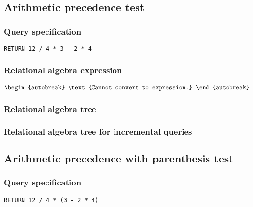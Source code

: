\subsection{Arithmetic precedence test}

\subsubsection*{Query specification}

\begin{lstlisting}
RETURN 12 / 4 * 3 - 2 * 4
\end{lstlisting}

\subsubsection*{Relational algebra expression}

\begin{align*}
\begin{autobreak}
\text{Cannot convert to expression.}
\end{autobreak}
\end{align*}

\subsubsection*{Relational algebra tree}


\subsubsection*{Relational algebra tree for incremental queries}


\subsection{Arithmetic precedence with parenthesis test}

\subsubsection*{Query specification}

\begin{lstlisting}
RETURN 12 / 4 * (3 - 2 * 4)
\end{lstlisting}

